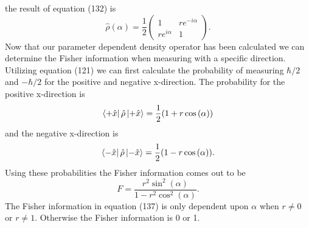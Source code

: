 \documentclass[twocolumn]{article}
\begin{document}
the result of equation (132) is
\begin{equation}
\hat{\rho}(\alpha)=\frac{1}{2}
\begin{pmatrix}
1 & re^{-i\alpha} \\
re^{i\alpha} & 1
\end{pmatrix}.
\end{equation}
Now that our parameter dependent density operator has been calculated we can determine the Fisher information when measuring with a specific direction. Utilizing equation (121) we can first calculate the probability of measuring $\hbar/2$ and $-\hbar/2$ for the positive and negative x-direction. The probability for the positive x-direction is
\begin{equation}
\bra{+\hat{x}} \hat{\rho} \ket{+\hat{x}}=\frac{1}{2}(1+r\cos{(\alpha)})
\end{equation}
and the negative x-direction is
\begin{equation}
\bra{-\hat{x}} \hat{\rho} \ket{-\hat{x}}=\frac{1}{2}(1-r\cos{(\alpha)}).
\end{equation}
Using these probabilities the Fisher information comes out to be
\begin{equation}
F=\frac{r^2\sin^2{(\alpha)}}{1-r^2\cos^2{(\alpha)}}.
\end{equation}
The Fisher information in equation (137) is only dependent upon $\alpha$ when $r\neq0$ or $r\neq1$. Otherwise the Fisher information is 0 or 1.
\end{document}
